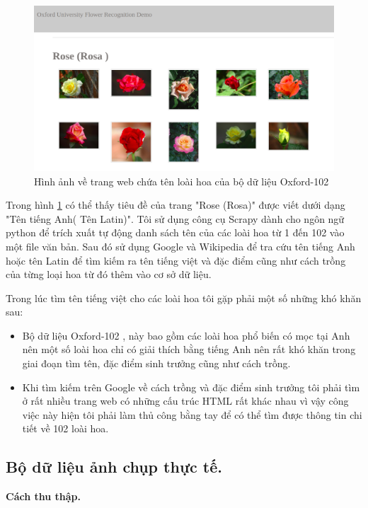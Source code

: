 \documentclass[12pt]{report}
\begin{document}
		\begin{figure}[h]
			\centering
			\includegraphics[scale=0.3]{rose_oxford}
			\caption{Hình ảnh về trang web chứa tên loài hoa của bộ dữ liệu Oxford-102}
			\label{fig:rose_oxford}
		\end{figure}
								
		Trong hình \ref{fig:rose_oxford} có thể thấy tiêu đề của trang "Rose (Rosa)" được viết dưới dạng "Tên tiếng Anh( Tên Latin)". Tôi sử dụng công cụ Scrapy dành cho ngôn ngữ python để trích xuất tự động danh sách tên của các loài hoa từ 1 đến 102 vào một file văn bản. Sau đó sử dụng Google và Wikipedia để tra cứu tên tiếng Anh hoặc tên Latin để tìm kiếm ra tên tiếng việt và đặc điểm cũng như cách trồng của từng loại hoa từ đó thêm vào cơ sở dữ liệu.
										
		Trong lúc tìm tên tiếng việt cho các loài hoa tôi gặp phải một số những khó khăn sau:
		\begin{itemize}
			\item Bộ dữ liệu Oxford-102 \cite{cia-Nilsback06}, này bao gồm các loài hoa phổ biến có mọc tại Anh nên một số loài hoa chỉ có giải thích bằng tiếng Anh nên rất khó khăn trong giai đoạn tìm tên, đặc điểm sinh trưởng cũng như cách trồng.
			\item Khi tìm kiếm trên Google về cách trồng và đặc điểm sinh trưởng tôi phải tìm ở rất nhiều trang web có những cấu trúc HTML rất khác nhau vì vậy công việc này hiện tôi phải làm thủ công bằng tay để có thể tìm được thông tin chi tiết về 102 loài hoa.
		\end{itemize}
								
		\subsection{Bộ dữ liệu ảnh chụp thực tế.}
		\textbf{Cách thu thập.}
								
\end{document}
